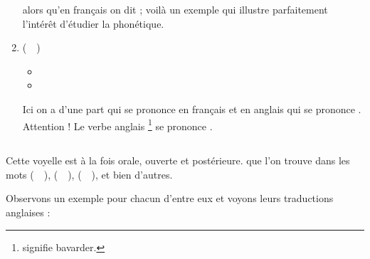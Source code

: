 \begin{enumerate}
    alors qu'en français on dit \href{http://www.wordreference.com/fren/bar}{}; voilà un exemple qui illustre parfaitement l'intérêt
    d'étudier la phonétique.
  \item {} (~~)
    \begin{itemize}
    \item {}
    \item {}
    \end{itemize}
    Ici on a d'une part  qui se prononce
    \href{http://www.wordreference.com/fren/chat}{} en français et
     en anglais qui se prononce
    \href{http://www.wordreference.com/enfr/cat}{}. Attention !
    Le verbe anglais \footnote{ signifie
      bavarder.} se prononce
    \href{https://en.oxforddictionaries.com/definition/chat}{}. 
\end{enumerate}

\subsection{}\label{subsec:ɑ}

Cette voyelle est à la fois orale, ouverte et postérieure. 
que l'on trouve dans les mots  (~~),
 (~~),  (~~), et bien d'autres.

Observons un exemple pour chacun d'entre eux et voyons leurs
traductions anglaises :\par

